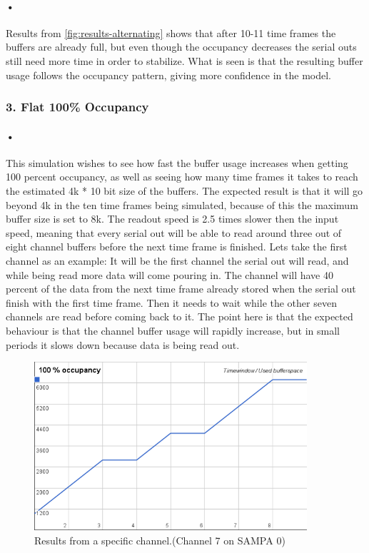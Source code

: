 \documentclass[a4paper, 12pt]{report}\dfrac{\right }{•}
\begin{document}
\paragraph{•} %
Results from \ref{fig:results-alternating} shows that after 10-11 time frames the buffers are already full, but even though the occupancy decreases the serial outs still need more time in order to stabilize.
What is seen is that the resulting buffer usage follows the occupancy pattern, giving more confidence in the model.

\subsubsection{3. Flat 100\% Occupancy}

\paragraph{•} %
This simulation wishes to see how fast the buffer usage increases when getting 100 percent occupancy, as well as seeing how many time frames it takes to reach the estimated 4k * 10 bit size of the buffers.
The expected result is that it will go beyond 4k in the ten time frames being simulated, because of this the maximum buffer size is set to 8k.
The readout speed is 2.5 times slower then the input speed, meaning that every serial out will be able to read around three out of eight channel buffers before the next time frame is finished.
Lets take the first channel as an example: It will be the first channel the serial out will read, and while being read more data will come pouring in.
The channel will have 40 percent of the data from the next time frame already stored when the serial out finish with the first time frame.
Then it needs to wait while the other seven channels are read before coming back to it.
The point here is that the expected behaviour is that the channel buffer usage will rapidly increase, but in small periods it slows down because data is being read out.

\begin{figure}[h!]
	\centering
		\includegraphics[width=0.9\textwidth]{images/flat-100.png}
		\caption{Results from a specific channel.(Channel 7 on SAMPA 0)}
		\label{fig:flat-100}
\end{figure}
\end{document}

